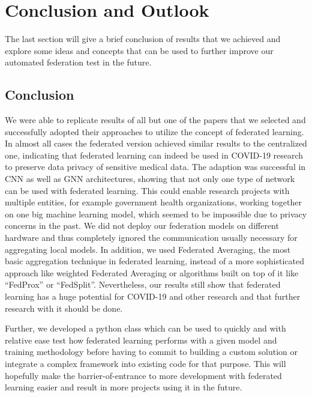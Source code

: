 \section{Conclusion and Outlook}
The last section will give a brief conclusion of results that we achieved and explore some ideas and concepts that can be used to further improve our automated federation test in the future.  

\subsection{Conclusion}
We were able to replicate results of all but one of the papers that we selected and successfully adopted their approaches to utilize the concept of federated learning. In almost all cases the federated version achieved similar results to the centralized one, indicating that federated learning can indeed be used in COVID-19 research to preserve data privacy of sensitive medical data. The adaption was successful in CNN as well as GNN architectures, showing that not only one type of network can be used with federated learning. This could enable research projects with multiple entities, for example government health organizations, working together on one big machine learning model, which seemed to be impossible due to privacy concerns in the past.
We did not deploy our federation models on different hardware and thus completely ignored the communication usually necessary for aggregating local models. In addition, we used Federated Averaging, the most basic aggregation technique in federated learning, instead of a more sophisticated approach like weighted Federated Averaging or algorithms built on top of it like \enquote{FedProx}\cite{fed_prox} or \enquote{FedSplit}\cite{fed_split}. Nevertheless, our results still show that federated learning has a huge potential for COVID-19 and other research and that further research with it should be done.

Further, we developed a python class which can be used to quickly and with relative ease test how federated learning performs with a given model and training methodology before having to commit to building a custom solution or integrate a complex framework into existing code for that purpose. This will hopefully make the barrier-of-entrance to more development with federated learning easier and result in more projects using it in the future.

